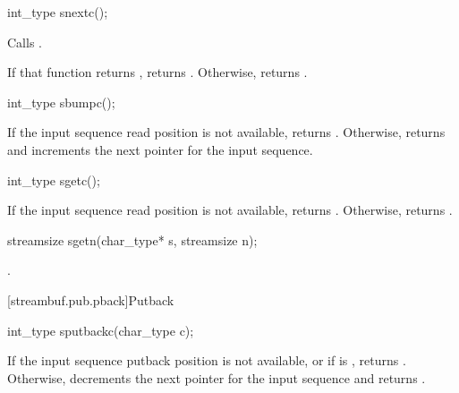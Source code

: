 %
\begin{itemdecl}
int_type snextc();
\end{itemdecl}

\begin{itemdescr}
\pnum
\effects
Calls
.

\pnum
\returns
If that function returns
,
returns
.
Otherwise, returns
.
\end{itemdescr}

%
\begin{itemdecl}
int_type sbumpc();
\end{itemdecl}

\begin{itemdescr}
\pnum
\effects
If the input sequence read position is not available,
returns
.
Otherwise, returns
and increments the next pointer for the input sequence.
\end{itemdescr}

%
\begin{itemdecl}
int_type sgetc();
\end{itemdecl}

\begin{itemdescr}
\pnum
\returns
If the input sequence read position is not available,
returns
.
Otherwise, returns
.
\end{itemdescr}

%
\begin{itemdecl}
streamsize sgetn(char_type* s, streamsize n);
\end{itemdecl}

\begin{itemdescr}
\pnum
\returns
{}.
\end{itemdescr}

[streambuf.pub.pback]{Putback}

%
\begin{itemdecl}
int_type sputbackc(char_type c);
\end{itemdecl}

\begin{itemdescr}
\pnum
\effects
If the input sequence putback position is not available, or
if
is , returns
.
Otherwise, decrements the next pointer for the input sequence and
returns
.
\end{itemdescr}


